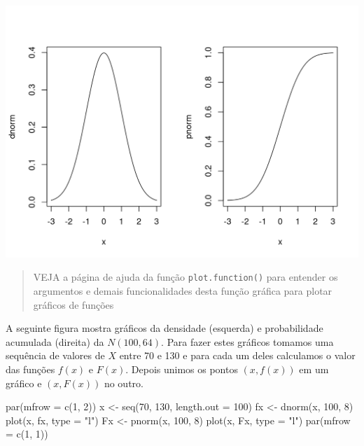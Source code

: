 \documentclass[
  10pt,
  a4paper]{book}
\newenvironment{Shaded}{\begin{snugshade}}{\end{snugshade}}
\newcommand{\AttributeTok}[1]{\textcolor[rgb]{0.77,0.63,0.00}{#1}}
\newcommand{\DecValTok}[1]{\textcolor[rgb]{0.00,0.00,0.81}{#1}}
\newcommand{\FunctionTok}[1]{\textcolor[rgb]{0.00,0.00,0.00}{#1}}
\newcommand{\NormalTok}[1]{#1}
\newcommand{\OtherTok}[1]{\textcolor[rgb]{0.56,0.35,0.01}{#1}}
\newcommand{\StringTok}[1]{\textcolor[rgb]{0.31,0.60,0.02}{#1}}
\begin{document}
\begin{center}\includegraphics{figures/unnamed-chunk-342-1} \end{center}

\begin{quote}
VEJA a página de ajuda da função \texttt{plot.function()} para entender os
argumentos e demais funcionalidades desta função gráfica para plotar
gráficos de funções
\end{quote}

A seguinte figura mostra gráficos da densidade (esquerda) e
probabilidade acumulada (direita) da \(N(100, 64)\). Para fazer estes
gráficos tomamos uma sequência de valores de \(X\) entre 70 e 130 e para
cada um deles calculamos o valor das funções \(f(x)\) e \(F(x)\). Depois
unimos os pontos \((x,f(x))\) em um gráfico e \((x,F(x))\) no outro.

\begin{Shaded}
\begin{Highlighting}[]
\FunctionTok{par}\NormalTok{(}\AttributeTok{mfrow =} \FunctionTok{c}\NormalTok{(}\DecValTok{1}\NormalTok{, }\DecValTok{2}\NormalTok{))}
\NormalTok{x }\OtherTok{\textless{}{-}} \FunctionTok{seq}\NormalTok{(}\DecValTok{70}\NormalTok{, }\DecValTok{130}\NormalTok{, }\AttributeTok{length.out =} \DecValTok{100}\NormalTok{)}
\NormalTok{fx }\OtherTok{\textless{}{-}} \FunctionTok{dnorm}\NormalTok{(x, }\DecValTok{100}\NormalTok{, }\DecValTok{8}\NormalTok{)}
\FunctionTok{plot}\NormalTok{(x, fx, }\AttributeTok{type =} \StringTok{"l"}\NormalTok{)}
\NormalTok{Fx }\OtherTok{\textless{}{-}} \FunctionTok{pnorm}\NormalTok{(x, }\DecValTok{100}\NormalTok{, }\DecValTok{8}\NormalTok{)}
\FunctionTok{plot}\NormalTok{(x, Fx, }\AttributeTok{type =} \StringTok{"l"}\NormalTok{)}
\FunctionTok{par}\NormalTok{(}\AttributeTok{mfrow =} \FunctionTok{c}\NormalTok{(}\DecValTok{1}\NormalTok{, }\DecValTok{1}\NormalTok{))}
\end{Highlighting}
\end{Shaded}
\end{document}
